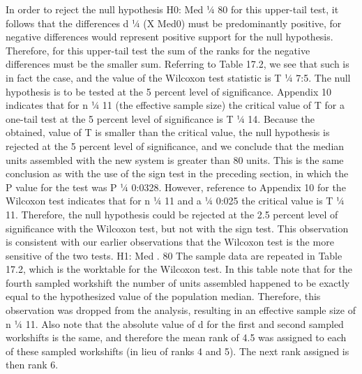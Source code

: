 In order to reject the null hypothesis H0: Med ¼ 80 for this upper-tail test, it follows that the differences
d ¼ (X   Med0) must be predominantly positive, for negative differences would represent positive support for
the null hypothesis. Therefore, for this upper-tail test the sum of the ranks for the negative differences must be
the smaller sum. Referring to Table 17.2, we see that such is in fact the case, and the value of the Wilcoxon test
statistic is T ¼ 7:5.
The null hypothesis is to be tested at the 5 percent level of significance. Appendix 10 indicates that for
n ¼ 11 (the effective sample size) the critical value of T for a one-tail test at the 5 percent level of
significance is T ¼ 14. Because the obtained, value of T is smaller than the critical value, the null hypothesis
is rejected at the 5 percent level of significance, and we conclude that the median units assembled with the
new system is greater than 80 units. This is the same conclusion as with the use of the sign test in the
preceding section, in which the P value for the test was P ¼ 0:0328. However, reference to Appendix 10 for
the Wilcoxon test indicates that for n ¼ 11 and a ¼ 0:025 the critical value is T ¼ 11. Therefore, the null
hypothesis could be rejected at the 2.5 percent level of significance with the Wilcoxon test, but not with the
sign test. This observation is consistent with our earlier observations that the Wilcoxon test is the more
sensitive of the two tests.
H1: Med . 80
The sample data are repeated in Table 17.2, which is the worktable for the Wilcoxon test. In this
table note that for the fourth sampled workshift the number of units assembled happened to be
exactly equal to the hypothesized value of the population median. Therefore, this observation was
dropped from the analysis, resulting in an effective sample size of n ¼ 11. Also note that the absolute
value of d for the first and second sampled workshifts is the same, and therefore the mean rank of 4.5
was assigned to each of these sampled workshifts (in lieu of ranks 4 and 5). The next rank assigned is
then rank 6.
